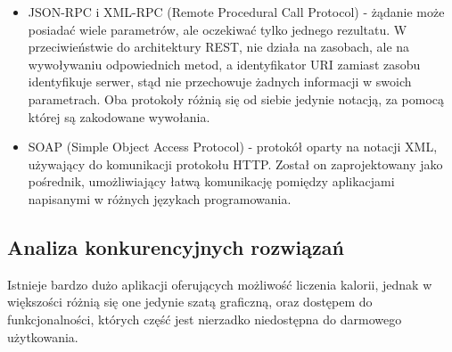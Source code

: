 \documentclass[12pt, a4paper]{article}
\begin{document}
\begin{sloppypar}
{{\begin{itemize}
\begin{itemize}
        Najczęściej używanym formatem wymiany danych jest notacja JSON.
        \item Interfejsy API REST korzystają z ujednoliconego interfejsu, co ułatwia 
        rozdzielenie implementacji klienta od implementacji usługi.
        \item Interfejsy API REST korzystają z bezstanowego modelu żądań. Żądania HTTP 
        powinny być niezależne i mogą występować w dowolnej kolejności, dlatego 
        zachowywanie informacji o stanie przejściowym między żądaniami nie jest możliwe.
        Informacje są przechowywane jedynie w zasobach, a każde żądanie powinno być 
        niepodzielną operacją.
        \item Interfejsy API REST są sterowane za pomocą hipermedialnych linków, 
        zawartych w reprezentacji.
      \end{itemize}
      \item JSON-RPC i XML-RPC (Remote Procedural Call Protocol) - żądanie może posiadać
      wiele parametrów, ale oczekiwać tylko jednego rezultatu. W przeciwieństwie do 
      architektury REST, nie działa na zasobach, ale na wywoływaniu odpowiednich metod,
      a identyfikator URI zamiast zasobu identyfikuje serwer, stąd nie przechowuje żadnych
      informacji w swoich parametrach. Oba protokoły różnią się od siebie jedynie notacją,
      za pomocą której są zakodowane wywołania.
      \item SOAP (Simple Object Access Protocol) - protokół oparty na notacji XML, używający
      do komunikacji protokołu HTTP. Został on zaprojektowany jako pośrednik, umożliwiający
      łatwą komunikację pomiędzy aplikacjami napisanymi w różnych językach programowania.
    \end{itemize} 
  }
  \subsection{Analiza konkurencyjnych rozwiązań}
  \label{sec:analysis}
  {
    Istnieje bardzo dużo aplikacji oferujących możliwość liczenia kalorii, jednak w 
    większości różnią się one jedynie szatą graficzną, oraz dostępem do funkcjonalności,
    których część jest nierzadko niedostępna do darmowego użytkowania.
}}
\end{sloppypar}
\end{document}
